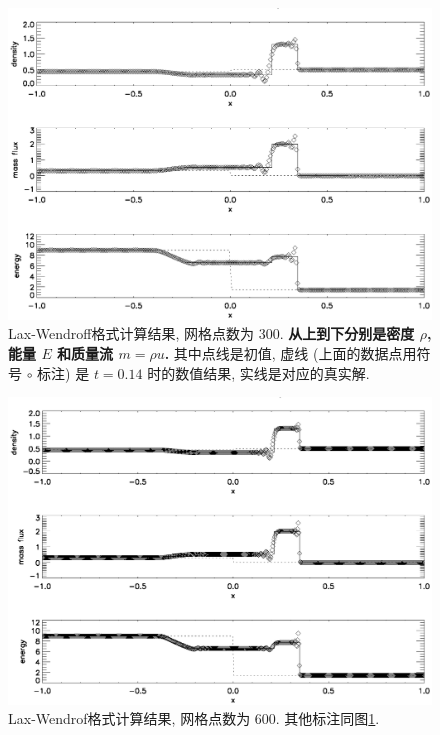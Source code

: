 \documentclass[10.5pt
]{article}
\begin{document}
\begin{figure}
\begin{center}
\includegraphics[width=.85\textwidth]{hw3_lax_300.eps}
\caption{Lax-Wendroff格式计算结果, 网格点数为 300. \textbf{从上到下分别是密度 $\rho$, 能量 $E$ 和质量流 $m = \rho u$.}
其中点线是初值, 虚线 (上面的数据点用符号 $\circ$ 标注) 是 $t=0.14$ 时的数值结果, 实线是对应的真实解.}\label{Fig:LaxA}
\end{center}
\end{figure}

\begin{figure}
\begin{center}
\includegraphics[width=.85\textwidth]{hw3_lax_600.eps}
\caption{Lax-Wendrof格式计算结果, 网格点数为 600. 
其他标注同图\ref{Fig:LaxA}.}\label{Fig:LaxB}
\end{center}
\end{figure}
\end{document}
